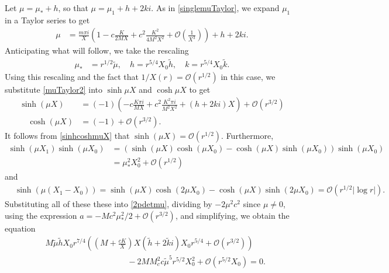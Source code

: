 \documentclass[12pt]{elsarticle}
\theoremstyle{plain}
\theoremstyle{definition}
\theoremstyle{remark}
\numberwithin{theorem}{section}
\numberwithin{equation}{section}
\begin{document}
Let $\mu = \mu_* + h$, so that $\mu = \mu_1 + h + 2 k i$. As in \cref{singlemuTaylor}, we expand $\mu_1$ in a Taylor series to get
\begin{align}\label{muTaylor2}
\mu &= \frac{m \pi i}{X}\left( 1 - c \frac{K}{2 M X} + c^2 \frac{K^2}{4 M^2 X^2} + \mathcal{O}\left(\frac{1}{X^3}\right) \right) + h + 2 k i.
\end{align}
Anticipating what will follow, we take the rescaling
\begin{align*}
\mu_* &= r^{1/2} \tilde{\mu}, \quad h = r^{5/4} X_0 \tilde{h}, \quad k = r^{5/4} X_0 \tilde{k}.
\end{align*}
Using this rescaling and the fact that $1/X(r) = \mathcal{O}(r^{1/2})$ in this case, we substitute \cref{muTaylor2} into $\sinh \mu X$ and $\cosh \mu X$ to get
\begin{equation}\label{sinhcoshmuX}
\begin{aligned}
\sinh(\mu X) &= (-1)\left( - c \frac{K \pi i }{MX} + c^2 \frac{K^2 \pi i }{M^2 X^2} + (h + 2 k i)X \right) + \mathcal{O}\left( r^{3/2} \right) \\
\quad \cosh(\mu X) &= (-1) + \mathcal{O}\left( r^{3/2} \right).
\end{aligned}
\end{equation}
It follows from \cref{sinhcoshmuX} that $\sinh(\mu X) =  \mathcal{O}(r^{1/2})$. Furthermore, 
\begin{align*}
\sinh(\mu X_1)\sinh(\mu X_0) &= \left( \sinh(\mu X) \cosh( \mu X_0)  - \cosh(\mu X)\sinh(\mu X_0) \right)\sinh(\mu X_0) \\
&= \mu_*^2 X_0^2 + \mathcal{O}(r^{1/2})
\end{align*}
and
\begin{align*}
&\sinh(\mu(X_1 - X_0)) = \sinh(\mu X) \cosh(2 \mu X_0) - \cosh(\mu X)\sinh(2 \mu X_0)
= \mathcal{O}\left( r^{1/2}|\log r| \right).
\end{align*}
Substituting all of these these into \cref{2pdetmu}, dividing by $-2 \mu^2 c^2$ since $\mu \neq 0$, using the expression $a = -M c^2 \mu_*^2/2 + \mathcal{O}(r^{3/2})$, and simplifying, we obtain the equation
\begin{equation}\label{det3}
\begin{aligned}
&M \tilde{\mu} \tilde{h} X_0 r^{7/4}
\left( \left( M + \frac{c K}{X} \right) X ( \tilde{h} + 2 \tilde{k} i) X_0 r^{5/4} + \mathcal{O}(r^{3/2}) \right) \\
&\qquad\qquad\qquad\qquad\qquad- 2 M M_c^2 c \tilde{\mu}^5 r^{5/2} X_0^2 + \mathcal{O}( r^{5/2} X_0 ) = 0.
\end{aligned}
\end{equation}
\end{document}
